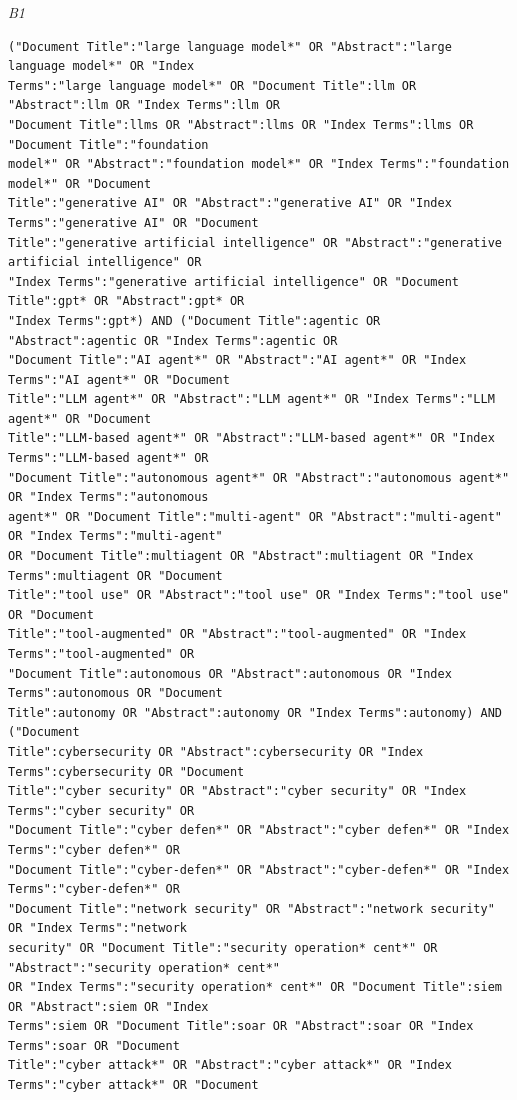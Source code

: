 \noindent\textit{B1}
\begin{lstlisting}
("Document Title":"large language model*" OR "Abstract":"large language model*" OR "Index
Terms":"large language model*" OR "Document Title":llm OR "Abstract":llm OR "Index Terms":llm OR
"Document Title":llms OR "Abstract":llms OR "Index Terms":llms OR "Document Title":"foundation
model*" OR "Abstract":"foundation model*" OR "Index Terms":"foundation model*" OR "Document
Title":"generative AI" OR "Abstract":"generative AI" OR "Index Terms":"generative AI" OR "Document
Title":"generative artificial intelligence" OR "Abstract":"generative artificial intelligence" OR
"Index Terms":"generative artificial intelligence" OR "Document Title":gpt* OR "Abstract":gpt* OR
"Index Terms":gpt*) AND ("Document Title":agentic OR "Abstract":agentic OR "Index Terms":agentic OR
"Document Title":"AI agent*" OR "Abstract":"AI agent*" OR "Index Terms":"AI agent*" OR "Document
Title":"LLM agent*" OR "Abstract":"LLM agent*" OR "Index Terms":"LLM agent*" OR "Document
Title":"LLM-based agent*" OR "Abstract":"LLM-based agent*" OR "Index Terms":"LLM-based agent*" OR
"Document Title":"autonomous agent*" OR "Abstract":"autonomous agent*" OR "Index Terms":"autonomous
agent*" OR "Document Title":"multi-agent" OR "Abstract":"multi-agent" OR "Index Terms":"multi-agent"
OR "Document Title":multiagent OR "Abstract":multiagent OR "Index Terms":multiagent OR "Document
Title":"tool use" OR "Abstract":"tool use" OR "Index Terms":"tool use" OR "Document
Title":"tool-augmented" OR "Abstract":"tool-augmented" OR "Index Terms":"tool-augmented" OR
"Document Title":autonomous OR "Abstract":autonomous OR "Index Terms":autonomous OR "Document
Title":autonomy OR "Abstract":autonomy OR "Index Terms":autonomy) AND ("Document
Title":cybersecurity OR "Abstract":cybersecurity OR "Index Terms":cybersecurity OR "Document
Title":"cyber security" OR "Abstract":"cyber security" OR "Index Terms":"cyber security" OR
"Document Title":"cyber defen*" OR "Abstract":"cyber defen*" OR "Index Terms":"cyber defen*" OR
"Document Title":"cyber-defen*" OR "Abstract":"cyber-defen*" OR "Index Terms":"cyber-defen*" OR
"Document Title":"network security" OR "Abstract":"network security" OR "Index Terms":"network
security" OR "Document Title":"security operation* cent*" OR "Abstract":"security operation* cent*"
OR "Index Terms":"security operation* cent*" OR "Document Title":siem OR "Abstract":siem OR "Index
Terms":siem OR "Document Title":soar OR "Abstract":soar OR "Index Terms":soar OR "Document
Title":"cyber attack*" OR "Abstract":"cyber attack*" OR "Index Terms":"cyber attack*" OR "Document

\end{lstlisting}
